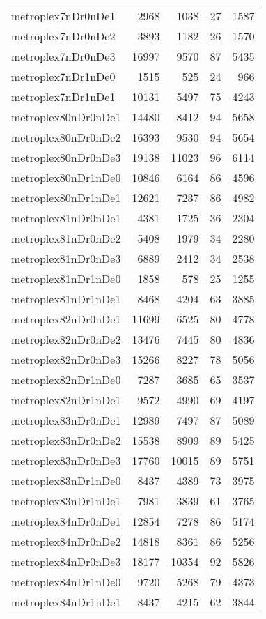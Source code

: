 \begin{longtable}{lrrrr}
metroplex7nDr0nDe1 & 2968 & 1038 & 27 & 1587 \\
metroplex7nDr0nDe2 & 3893 & 1182 & 26 & 1570 \\
metroplex7nDr0nDe3 & 16997 & 9570 & 87 & 5435 \\
metroplex7nDr1nDe0 & 1515 & 525 & 24 & 966 \\
metroplex7nDr1nDe1 & 10131 & 5497 & 75 & 4243 \\
metroplex80nDr0nDe1 & 14480 & 8412 & 94 & 5658 \\
metroplex80nDr0nDe2 & 16393 & 9530 & 94 & 5654 \\
metroplex80nDr0nDe3 & 19138 & 11023 & 96 & 6114 \\
metroplex80nDr1nDe0 & 10846 & 6164 & 86 & 4596 \\
metroplex80nDr1nDe1 & 12621 & 7237 & 86 & 4982 \\
metroplex81nDr0nDe1 & 4381 & 1725 & 36 & 2304 \\
metroplex81nDr0nDe2 & 5408 & 1979 & 34 & 2280 \\
metroplex81nDr0nDe3 & 6889 & 2412 & 34 & 2538 \\
metroplex81nDr1nDe0 & 1858 & 578 & 25 & 1255 \\
metroplex81nDr1nDe1 & 8468 & 4204 & 63 & 3885 \\
metroplex82nDr0nDe1 & 11699 & 6525 & 80 & 4778 \\
metroplex82nDr0nDe2 & 13476 & 7445 & 80 & 4836 \\
metroplex82nDr0nDe3 & 15266 & 8227 & 78 & 5056 \\
metroplex82nDr1nDe0 & 7287 & 3685 & 65 & 3537 \\
metroplex82nDr1nDe1 & 9572 & 4990 & 69 & 4197 \\
metroplex83nDr0nDe1 & 12989 & 7497 & 87 & 5089 \\
metroplex83nDr0nDe2 & 15538 & 8909 & 89 & 5425 \\
metroplex83nDr0nDe3 & 17760 & 10015 & 89 & 5751 \\
metroplex83nDr1nDe0 & 8437 & 4389 & 73 & 3975 \\
metroplex83nDr1nDe1 & 7981 & 3839 & 61 & 3765 \\
metroplex84nDr0nDe1 & 12854 & 7278 & 86 & 5174 \\
metroplex84nDr0nDe2 & 14818 & 8361 & 86 & 5256 \\
metroplex84nDr0nDe3 & 18177 & 10354 & 92 & 5826 \\
metroplex84nDr1nDe0 & 9720 & 5268 & 79 & 4373 \\
metroplex84nDr1nDe1 & 8437 & 4215 & 62 & 3844 \\

\end{longtable}

